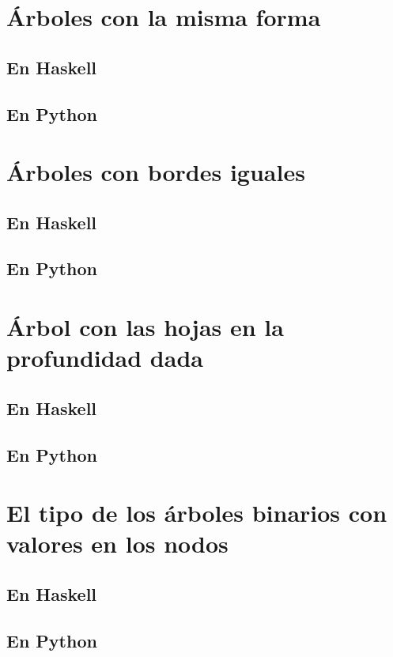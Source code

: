\documentclass[a4paper,12pt,twoside]{book}
\begin{document}
\section{Árboles con la misma forma}
\subsection*{En Haskell}
\subsection*{En Python}

\section{Árboles con bordes iguales}
\subsection{En Haskell}
\subsection{En Python}

\section{Árbol con las hojas en la profundidad dada}
\subsection*{En Haskell}
\subsection*{En Python}

\section{El tipo de los árboles binarios con valores en los nodos}
\subsection{En Haskell}
\subsection{En Python}
\end{document}
